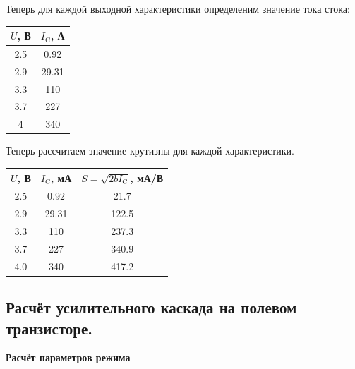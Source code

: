 Теперь для каждой выходной характеристики определеним значение тока стока:
\begin{table}[H]
\centering
\begin{tabular}{|c|c|}
\hline
$U$, В & $I_\text{C}$, А \\ \hline
2.5 & 0.92 \\ \hline
2.9 & 29.31 \\ \hline
3.3 & 110 \\ \hline
3.7 & 227 \\ \hline
4 & 340 \\ \hline
\end{tabular}
\end{table}

Теперь рассчитаем значение крутизны для каждой характеристики.

\begin{table}[H]
\centering
\begin{tabular}{|c|c|c|}
\hline
$U$, В & $I_\text{C}$, мА & $S=\sqrt{2bI_\text{C}}$, мА/В \\ \hline
2.5 & 0.92  & 21.7  \\ \hline
2.9 & 29.31 & 122.5 \\ \hline
3.3 & 110   & 237.3 \\ \hline
3.7 & 227   & 340.9 \\ \hline
4.0 & 340   & 417.2 \\ \hline
\end{tabular}
\end{table}

\subsection*{Расчёт усилительного каскада на полевом транзисторе.}


\textbf{Расчёт параметров режима}\\

